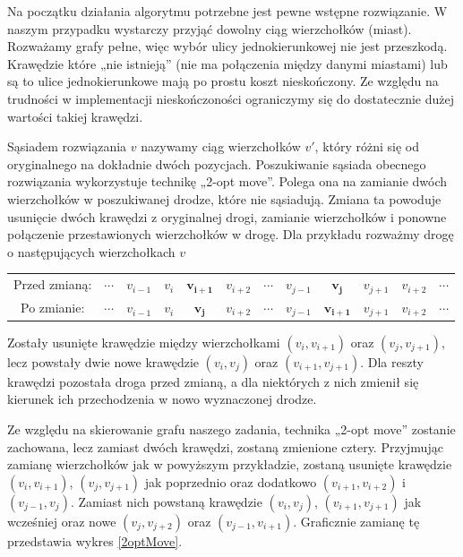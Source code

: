 \documentclass[11pt,a4paper,twoside]{article}
\begin{document}
Na początku działania algorytmu potrzebne jest pewne wstępne rozwiązanie. W naszym przypadku wystarczy przyjąć dowolny ciąg wierzchołków (miast). Rozważamy grafy pełne, więc wybór ulicy jednokierunkowej nie jest przeszkodą. Krawędzie które „nie istnieją” (nie ma połączenia między danymi miastami) lub są to ulice jednokierunkowe mają po prostu koszt nieskończony. Ze względu na trudności w implementacji nieskończoności ograniczymy się do dostatecznie dużej wartości takiej krawędzi.

Sąsiadem rozwiązania $v$ nazywamy ciąg wierzchołków $v'$, który różni się od oryginalnego na dokładnie dwóch pozycjach. Poszukiwanie sąsiada obecnego rozwiązania wykorzystuje technikę „2-opt move”. Polega ona na zamianie dwóch wierzchołków w poszukiwanej drodze, które nie sąsiadują. Zmiana ta powoduje usunięcie dwóch krawędzi z oryginalnej drogi, zamianie wierzchołków i ponowne połączenie przestawionych wierzchołków w drogę. Dla przykładu rozważmy drogę o następujących wierzchołkach $v$

\bgroup
\def\arraystretch{1.5}
\begin{tabular}{cccccccccccc}
Przed zmianą: & $\cdots$ & $v_{i-1}$ & $v_{i}$ & $\mathbf{v_{i+1}}$ & $v_{i+2}$ & $\cdots$ & $v_{j-1}$ & $\mathbf{v_{j}}$ & $v_{j+1}$ & $v_{i+2}$ & $\cdots$\\
Po zmianie: & $\cdots$ & $v_{i-1}$ & $v_{i}$ & $\mathbf{v_{j}}$ & $v_{i+2}$ & $\cdots$ & $v_{j-1}$ & $\mathbf{v_{i+1}}$ & $v_{j+1}$ & $v_{i+2}$ & $\cdots$\\
\end{tabular}
\egroup

Zostały usunięte krawędzie między wierzchołkami $(v_{i}, v_{i+1})$ oraz $(v_{j}, v_{j+1})$, lecz powstały dwie nowe krawędzie $(v_{i}, v_{j})$ oraz $(v_{i+1}, v_{j+1})$. Dla reszty krawędzi pozostała droga przed zmianą, a dla niektórych z nich zmienił się kierunek ich przechodzenia w nowo wyznaczonej drodze.

Ze względu na skierowanie grafu naszego zadania, technika „2-opt move” zostanie zachowana, lecz zamiast dwóch krawędzi, zostaną zmienione cztery. Przyjmując zamianę wierzchołków jak w powyższym przykładzie, zostaną usunięte krawędzie $(v_{i}, v_{i+1})$, $(v_{j}, v_{j+1})$ jak poprzednio oraz dodatkowo $(v_{i+1}, v_{i+2})$ i $(v_{j-1}, v_{j})$. Zamiast nich powstaną krawędzie $(v_{i}, v_{j})$, $(v_{i+1}, v_{j+1})$ jak wcześniej oraz nowe $(v_{j}, v_{j+2})$ oraz $(v_{j-1}, v_{i+1})$. Graficznie zamianę tę przedstawia wykres \ref{2optMove}.
\end{document}
